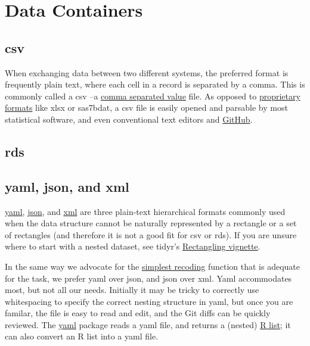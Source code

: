 \documentclass[
]{book}
\begin{document}
\hypertarget{data-containers}{%
\section{Data Containers}\label{data-containers}}

\hypertarget{data-containers-csv}{%
\subsection{csv}\label{data-containers-csv}}

When exchanging data between two different systems, the preferred format is frequently plain text, where each cell in a record is separated by a comma. This is commonly called a csv --a \href{https://en.wikipedia.org/wiki/Comma-separated_values}{comma separated value} file. As opposed to \protect\hyperlink{data-containers-avoid}{proprietary formats} like xlsx or sas7bdat, a csv file is easily opened and parsable by most statistical software, and even conventional text editors and \href{https://help.github.com/en/github/managing-files-in-a-repository/rendering-csv-and-tsv-data}{GitHub}.

\hypertarget{data-containers-rds}{%
\subsection{rds}\label{data-containers-rds}}

\hypertarget{data-containers-yaml}{%
\subsection{yaml, json, and xml}\label{data-containers-yaml}}

\href{https://circleci.com/blog/what-is-yaml-a-beginner-s-guide/}{yaml}, \href{https://www.w3schools.com/js/js_json_intro.asp}{json}, and \href{https://www.w3schools.com/xml/}{xml} are three plain-text hierarchical formats commonly used when the data structure cannot be naturally represented by a rectangle or a set of rectangles (and therefore it is not a good fit for csv or rds). If you are unsure where to start with a nested dataset, see tidyr's \href{https://tidyr.tidyverse.org/articles/rectangle.html}{Rectangling vignette}.

In the same way we advocate for the \href{https://ouhscbbmc.github.io/data-science-practices-1/coding.html\#coding-simplify-recoding}{simplest recoding} function that is adequate for the task, we prefer yaml over json, and json over xml. Yaml accommodates most, but not all our needs. Initially it may be tricky to correctly use whitespacing to specify the correct nesting structure in yaml, but once you are familar, the file is easy to read and edit, and the Git diffs can be quickly reviewed. The \href{http://biostat.mc.vanderbilt.edu/wiki/Main/YamlR}{yaml} package reads a yaml file, and returns a (nested) \href{https://www.tutorialspoint.com/r/r_lists.htm}{R list}; it can also convert an R list into a yaml file.
\end{document}
